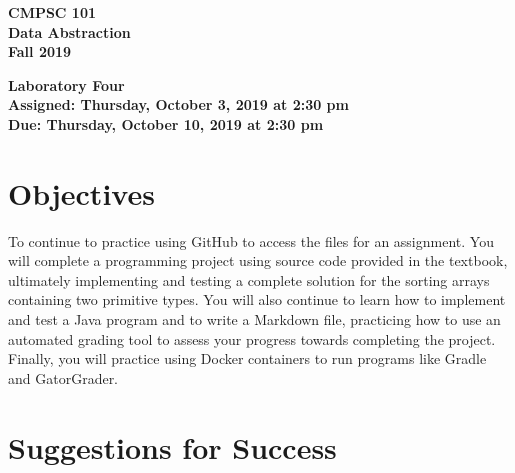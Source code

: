 \documentclass[11pt]{article}
\newcommand{\assignmentduedate}{October 10}
\newcommand{\assignmentassignedate}{October 3}
\newcommand{\assignmentnumber}{Four}
\newcommand{\labyear}{2019}
\newcommand{\labday}{Thursday}
\newcommand{\labtime}{2:30 pm}
\newcommand{\assigneddate}{Assigned: \labday, \assignmentassignedate, \labyear{} at \labtime{}}
\newcommand{\duedate}{Due: \labday, \assignmentduedate, \labyear{} at \labtime{}}
\newcommand{\labtitle}[1]
{
  \begin{center}
    \begin{center}
      \bf
      CMPSC 101\\Data Abstraction\\
      Fall 2019\\
      \medskip
    \end{center}
    \bf
    #1
  \end{center}
}
\begin{document}
\thispagestyle{empty}

\labtitle{Laboratory \assignmentnumber{} \\ \assigneddate{} \\ \duedate{}}

\section*{Objectives}

To continue to practice using GitHub to access the files for an assignment. You
will complete a programming project using source code provided in the textbook,
ultimately implementing and testing a complete solution for the sorting arrays
containing two primitive types. You will also continue to learn how to implement
and test a Java program and to write a Markdown file, practicing how to use an
automated grading tool to assess your progress towards completing the project.
Finally, you will practice using Docker containers to run programs like Gradle
and GatorGrader.

\section*{Suggestions for Success}
\end{document}
